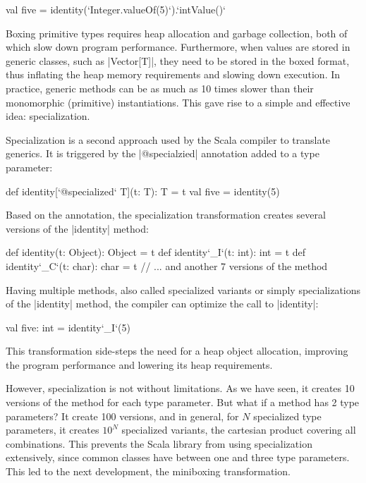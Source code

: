 \begin{lstlisting-nobreak}
 val five = identity(`Integer.valueOf(5)`).`intValue()`
\end{lstlisting-nobreak}

Boxing primitive types requires heap allocation and garbage collection, both of which slow down program performance. Furthermore, when values are stored in generic classes, such as |Vector[T]|, they need to be stored in the boxed format, thus inflating the heap memory requirements and slowing down execution. In practice, generic methods can be as much as 10 times slower than their monomorphic (primitive) instantiations. This gave rise to a simple and effective idea: specialization.

Specialization is a second approach used by the Scala compiler to translate generics. It is triggered by the |@specialzied| annotation added to a type parameter:

\begin{lstlisting-nobreak}
 def identity[`@specialized` T](t: T): T = t
 val five = identity(5)
\end{lstlisting-nobreak}

Based on the annotation, the specialization transformation creates several versions of the |identity| method:

\begin{lstlisting-nobreak}
 def identity(t: Object): Object = t
 def identity`_I`(t: int): int = t
 def identity`_C`(t: char): char = t
 // ... and another 7 versions of the method
\end{lstlisting-nobreak}

Having multiple methods, also called specialized variants or simply specializations of the |identity| method, the compiler can optimize the call to |identity|:

\begin{lstlisting-nobreak}
 val five: int = identity`_I`(5)
\end{lstlisting-nobreak}

This transformation side-steps the need for a heap object allocation, improving the program performance and lowering its heap requirements.

However, specialization is not without limitations. As we have seen, it creates 10 versions of the method for each type parameter. But what if a method has 2 type parameters? It create 100 versions, and in general, for $N$ specialized type parameters, it creates $10^N$ specialized variants, the cartesian product covering all combinations. This prevents the Scala library from using specialization extensively, since common classes have between one and three type parameters. This led to the next development, the miniboxing transformation.


